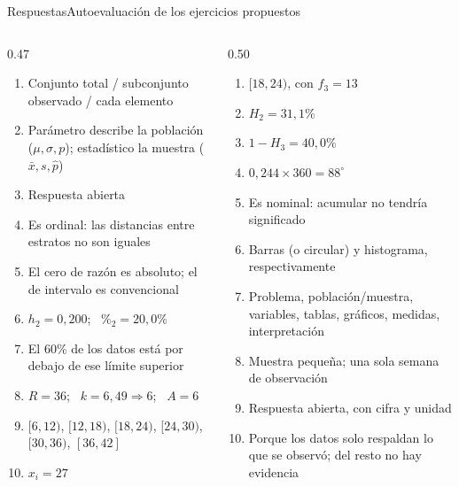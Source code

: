 \documentclass[aspectratio=169,10pt]{beamer}
\begin{document}
\begin{frame}{Respuestas}{Autoevaluación de los ejercicios propuestos}
  \tiny
  \begin{columns}[T,onlytextwidth]
    \begin{column}{0.47\textwidth}
      \begin{enumerate}\setlength{\itemsep}{0.16cm}
        \item Conjunto total / subconjunto observado / cada elemento
        \item Parámetro describe la población ($\mu,\sigma,p$); estadístico
              la muestra ($\bar x,s,\hat p$)
        \item Respuesta abierta
        \item Es ordinal: las distancias entre estratos no son iguales
        \item El cero de razón es absoluto; el de intervalo es convencional
        \item $h_2 = 0{,}200$; \ $\%_2 = 20{,}0\%$
        \item El 60\% de los datos está por debajo de ese límite superior
        \item $R=36$; \ $k=6{,}49 \Rightarrow 6$; \ $A=6$
        \item $[6,12)$, $[12,18)$, $[18,24)$, $[24,30)$, $[30,36)$, $[36,42]$
        \item $x_i = 27$
      \end{enumerate}
    \end{column}
    \begin{column}{0.50\textwidth}
      \begin{enumerate}\setlength{\itemsep}{0.16cm}
        \setcounter{enumi}{10}
        \item $[18,24)$, con $f_3 = 13$
        \item $H_2 = 31{,}1\%$
        \item $1-H_3 = 40{,}0\%$
        \item $0{,}244\times360 = 88^\circ$
        \item Es nominal: acumular no tendría significado
        \item Barras (o circular) y histograma, respectivamente
        \item Problema, población/muestra, variables, tablas, gráficos,
              medidas, interpretación
        \item Muestra pequeña; una sola semana de observación
        \item Respuesta abierta, con cifra y unidad
        \item Porque los datos solo respaldan lo que se observó; del resto
              no hay evidencia
      \end{enumerate}
    \end{column}
  \end{columns}
\end{frame}
\end{document}
